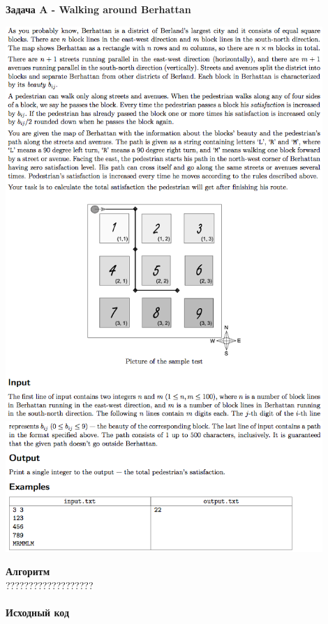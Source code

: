 \documentclass[a4paper,12pt]{article}
\begin{document}
\newpage
\textbf{{\large Задача A - Walking around Berhattan}} \\
\begin{center}
\includegraphics[width=0.9\textwidth]{CT_S02E05/CT_S02E05_A1.png}\\ [1cm]
\includegraphics[width=0.9\textwidth]{CT_S02E05/CT_S02E05_A2.png}\\ [1cm]
\end{center}
\textbf{{\large Алгоритм}} \\
{\Huge ???????????????????} \\ 
\\
\textbf{{\large Исходный код}}
\end{document}
